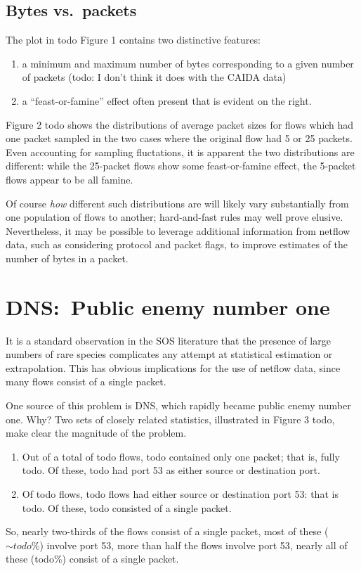 \documentclass{paper}
\begin{document}
\subsection{Bytes vs.\ packets}

The plot in todo Figure 1 contains two distinctive features:
\begin{enumerate}
  \item a minimum and maximum number of bytes corresponding to a given number
    of packets (todo: I don't think it does with the CAIDA data)
  \item a ``feast-or-famine'' effect often present that is evident on the
    right.
\end{enumerate}
Figure 2 todo shows the distributions of average packet sizes for flows which
had one packet sampled in the two cases where the original flow had 5 or 25
packets. Even accounting for sampling fluctations, it is apparent the two
distributions are different: while the 25-packet flows show some
feast-or-famine effect, the 5-packet flows appear to be all famine.

Of course \emph{how} different such distributions are will likely vary
substantially from one population of flows to another; hard-and-fast rules may
well prove elusive. Nevertheless, it may be possible to leverage additional
information from netflow data, such as considering protocol and packet flags,
to improve estimates of the number of bytes in a packet.

\section{DNS:\ Public enemy number one}

It is a standard observation in the SOS literature that the presence of large
numbers of rare species complicates any attempt at statistical estimation or
extrapolation. This has obvious implications for the use of netflow data, since
many flows consist of a single packet.

One source of this problem is DNS, which rapidly became public enemy number
one. Why? Two sets of closely related statistics, illustrated in Figure 3 todo,
make clear the magnitude of the problem.

\begin{enumerate}
  \item Out of a total of todo flows, todo contained only one packet;
    that is, fully todo. Of these, todo had port 53 as either source or
    destination port.
  \item Of todo flows, todo flows had either source or destination port
    53: that is todo. Of these, todo consisted of a single packet.
\end{enumerate}
So, nearly two-thirds of the flows consist of a single packet, most of these
($\sim todo\%$) involve port 53, more than half the flows involve port 53, nearly
all of these (todo\%) consist of a single packet.
\end{document}
